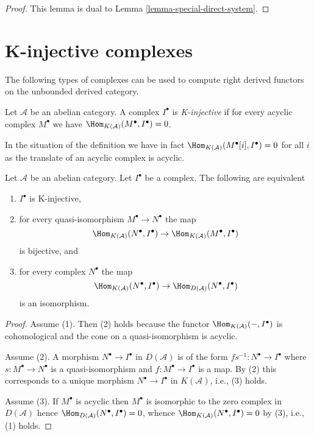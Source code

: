 \begin{proof}
This lemma is dual to
Lemma \ref{lemma-special-direct-system}.
\end{proof}




\section{K-injective complexes}
\label{section-K-injective}

\noindent
The following types of complexes can be used to compute right derived
functors on the unbounded derived category.

\begin{definition}
\label{definition-K-injective}
Let $\mathcal{A}$ be an abelian category. A complex $I^\bullet$
is {\it K-injective} if for every acyclic complex $M^\bullet$ we
have $\Hom_{K(\mathcal{A})}(M^\bullet, I^\bullet) = 0$.
\end{definition}

\noindent
In the situation of the definition we have in fact
$\Hom_{K(\mathcal{A})}(M^\bullet[i], I^\bullet) = 0$ for all $i$
as the translate of an acyclic complex is acyclic.

\begin{lemma}
\label{lemma-K-injective}
Let $\mathcal{A}$ be an abelian category.
Let $I^\bullet$ be a complex. The following are equivalent
\begin{enumerate}
\item $I^\bullet$ is K-injective,
\item for every quasi-isomorphism $M^\bullet \to N^\bullet$ the map
$$
\Hom_{K(\mathcal{A})}(N^\bullet, I^\bullet)
\to \Hom_{K(\mathcal{A})}(M^\bullet, I^\bullet)
$$
is bijective, and
\item for every complex $N^\bullet$ the map
$$
\Hom_{K(\mathcal{A})}(N^\bullet, I^\bullet)
\to \Hom_{D(\mathcal{A})}(N^\bullet, I^\bullet)
$$
is an isomorphism.
\end{enumerate}
\end{lemma}

\begin{proof}
Assume (1). Then (2) holds because the functor
$\Hom_{K(\mathcal{A})}( - , I^\bullet)$ is cohomological
and the cone on a quasi-isomorphism is acyclic.

\medskip\noindent
Assume (2). A morphism $N^\bullet \to I^\bullet$ in $D(\mathcal{A})$
is of the form $fs^{-1} : N^\bullet \to I^\bullet$ where
$s : M^\bullet \to N^\bullet$ is a quasi-isomorphism and
$f : M^\bullet \to I^\bullet$ is a map. By (2) this corresponds to
a unique morphism $N^\bullet \to I^\bullet$ in $K(\mathcal{A})$, i.e.,
(3) holds.

\medskip\noindent
Assume (3). If $M^\bullet$ is acyclic then $M^\bullet$ is isomorphic
to the zero complex in $D(\mathcal{A})$ hence
$\Hom_{D(\mathcal{A})}(N^\bullet, I^\bullet) = 0$, whence
$\Hom_{K(\mathcal{A})}(N^\bullet, I^\bullet) = 0$ by (3),
i.e., (1) holds.
\end{proof}

